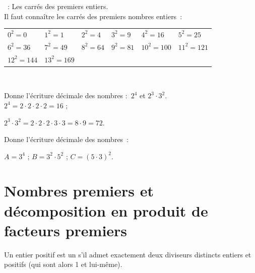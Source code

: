 \vspace{4em}

\begin{methode*1}

\begin{exemple*1}
 : Les carrés des premiers entiers. \\[1em]
Il faut connaître les carrés des premiers nombres entiers : 

\begin{tabularx}{0.7\textwidth}{llllll}
$0^2 = 0$	& $1^2 = 1$ & $2^2 = 4$ & $3^2 = 9$ & $4^2 = 16$ & $5^2 = 25$ \\
$6^2 = 36$ & $7^2 = 49$ & $8^2 = 64$ & $9^2 = 81$ & $10^2 = 100$ & $11^2 = 121$ \\ 
$12^2 = 144$ & $13^2 = 169$ & & & & \\
 \end{tabularx} \\
 \end{exemple*1}

\begin{exemple*1}
Donne l'écriture décimale des nombres : $2^4$ et $2^3 \cdot 3^2$. \\[1em]
$2^4 =  2 \cdot 2 \cdot 2 \cdot 2 = 16$ ;

$2^3 \cdot 3^2 = 2 \cdot 2 \cdot 2 \cdot 3 \cdot 3 = 8 \cdot 9 = 72$.
 \end{exemple*1}

\exercice  
Donne l'écriture décimale des nombres : 

$A = 3^4$ ; $B = 3^2 \cdot 5^2$ ; $C = (5 \cdot 3)^2$.

\vspace{6em}


 \end{methode*1}
 
 

\newpage

\section{Nombres premiers et décomposition en produit de facteurs premiers}


\vspace{6em}

\begin{definition}
Un entier positif est un  s'il admet exactement deux diviseurs distincts entiers et positifs (qui sont alors 1 et lui-même).
\end{definition}

